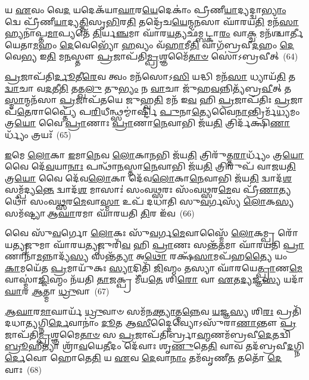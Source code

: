 𑌯 \ul{𑌏}\-𑌵𑌂 𑌵𑍇\-\ul{𑌦} 𑌯𑌦𑍇𑌕᳴𑌯𑌾\-\ul{𑌘𑌾}\-𑌰\-\ul{𑌯𑍇}\-𑌦𑍇𑌕𑌾𑌂॑ 𑌪𑍍𑌰𑍀𑌣𑍀\-\ul{𑌯𑌾}\-𑌦𑍍𑌯𑌦𑍍𑌦𑍍𑌵𑌾\-\ul{𑌭𑍍𑌯𑌾𑌂} 𑌦𑍍𑌵𑍇 𑌪𑍍𑌰𑍀᳴𑌣𑍀\-\ul{𑌯𑌾}\-𑌦𑍍𑌯\-\ul{𑌤𑍍𑌤𑌿}\-𑌸𑍃\-\ul{𑌭𑌿}\-𑌰\-\ul{𑌤𑌿} 𑌤𑌦𑍍𑌰𑍇᳴𑌚\-\ul{𑌯𑍇}\-𑌨𑍍𑌮\-\ul{𑌨}\-𑌸𑌾 𑌘𑌾᳴𑌰𑌯\-\ul{𑌤𑌿} 𑌮𑌨᳴\-\ul{𑌸𑌾} 𑌹𑍍𑌯𑌨𑌾॑𑌪𑍍𑌤\-\ul{𑌮𑌾}\-𑌪𑍍𑌯𑌤𑍇᳴ \ul{𑌤𑌿}\-𑌰𑍍𑌯\-\ul{𑌞𑍍𑌚}\-𑌮𑌾 𑌘𑌾᳴𑌰\-\ul{𑌯}\-𑌤𑍍𑌯𑌛᳴𑌮𑍍𑌬𑌟𑍍𑌕𑌾\-\ul{𑌰𑌂} 𑌵𑌾\-\ul{𑌕𑍍𑌚} 𑌮𑌨᳴𑌶𑍍𑌚𑌾𑌰𑍍𑌤𑍀𑌯𑍇𑌤𑌾\-\ul{𑌮}\-𑌹𑌂 \ul{𑌦𑍇}\-𑌵𑍇𑌭𑍍𑌯𑍋᳴ \ul{𑌹}\-𑌵𑍍𑌯𑌂 𑌵᳴\-\ul{𑌹𑌾}\-𑌮𑍀\-\ul{𑌤𑌿} 𑌵𑌾𑌗᳴𑌬𑍍𑌰𑌵𑍀\-\ul{𑌦}\-𑌹𑌂 \ul{𑌦𑍇}\-𑌵𑍇\-\ul{𑌭𑍍𑌯} 𑌇\-\ul{𑌤𑌿} 𑌮\-\ul{𑌨}\-𑌸𑍍𑌤𑍗 \ul{𑌪𑍍𑌰}\-𑌜𑌾𑌪᳴𑌤𑌿\-\ul{𑌮𑍍𑌪𑍍𑌰}\-𑌶𑍍𑌞𑌮𑍈᳴\-\ul{𑌤𑌾}\-\-\ul{𑍞} 𑌸𑍋॑\-𑌽𑌬𑍍𑌰𑌵𑍀𑌤𑍍~(64)

\-\ul{𑌪𑍍𑌰}\-𑌜𑌾𑌪᳴𑌤𑌿\-\ul{𑌰𑍍𑌦𑍂}\-𑌤𑍀\-\ul{𑌰𑍇}\-𑌵 𑌤𑍍𑌵𑌂 𑌮𑌨᳴𑌸𑍋\-𑌽\-\ul{𑌸𑌿} 𑌯𑌦𑍍𑌧𑌿 𑌮𑌨᳴\-\ul{𑌸𑌾} 𑌧𑍍𑌯𑌾𑌯᳴\-\ul{𑌤𑌿} 𑌤\-\ul{𑌦𑍍𑌵𑌾}\-𑌚𑌾 𑌵\-\ul{𑌦}\-𑌤𑍀\-\ul{𑌤𑌿} 𑌤𑌤𑍍𑌖\-\ul{𑌲𑍁} 𑌤𑍁\-\ul{𑌭𑍍𑌯𑌂} 𑌨 \ul{𑌵𑌾}\-𑌚𑌾 𑌜𑍁᳴𑌹\-\ul{𑌵}\-𑌨𑍍𑌨𑌿𑌤𑍍𑌯᳴𑌬𑍍𑌰\-\ul{𑌵𑍀}\-𑌤𑍍 𑌤\-\ul{𑌸𑍍𑌮𑌾}\-𑌨𑍍𑌮𑌨᳴𑌸𑌾 \ul{𑌪𑍍𑌰}\-𑌜𑌾𑌪᳴𑌤𑌯𑍇 𑌜𑍁𑌹𑍍𑌵\-\ul{𑌤𑌿} 𑌮𑌨᳴ 𑌇\-\ul{𑌵} 𑌹𑌿 \ul{𑌪𑍍𑌰}\-𑌜𑌾𑌪᳴𑌤𑌿𑌃 \ul{𑌪𑍍𑌰}\-𑌜𑌾𑌪᳴\-\ul{𑌤𑍇}\-𑌰𑌾𑌪𑍍𑌤𑍍𑌯𑍈᳴ 𑌪\-\ul{𑌰𑌿}\-𑌧𑍀𑌨𑍍𑌥𑍍𑌸𑌮𑍍𑌮𑌾॑𑌰𑍍𑌷𑍍𑌟𑌿 \ul{𑌪𑍁}\-𑌨𑌾\-\ul{𑌤𑍍𑌯𑍇}\-𑌵𑍈\-\ul{𑌨𑌾}\-𑌨𑍍𑌤𑍍𑌰𑌿𑌰𑍍𑌮᳴\-\ul{𑌧𑍍𑌯}\-𑌮𑌂 𑌤𑍍𑌰\-\ul{𑌯𑍋} 𑌵𑍈 \ul{𑌪𑍍𑌰𑌾}\-𑌣𑌾𑌃 \ul{𑌪𑍍𑌰𑌾}\-𑌣𑌾\-\ul{𑌨𑍇}\-𑌵𑌾𑌭𑌿 𑌜᳴𑌯\-\ul{𑌤𑌿} 𑌤𑍍𑌰𑌿𑌰𑍍𑌦᳴𑌕𑍍𑌷𑌿\-\ul{𑌣𑌾}\-𑌰𑍍𑌧𑍍𑌯𑌂᳴ 𑌤𑍍𑌰𑌯𑌃᳴~(65)

\-\ul{𑌇}\-𑌮𑍇 \ul{𑌲𑍋}\-𑌕𑌾 \ul{𑌇}\-𑌮𑌾\-\ul{𑌨𑍇}\-𑌵 \ul{𑌲𑍋}\-𑌕𑌾\-\ul{𑌨}\-𑌭𑌿 𑌜᳴𑌯\-\ul{𑌤𑌿} 𑌤𑍍𑌰𑌿𑌰𑍁᳴𑌤𑍍𑌤\-\ul{𑌰𑌾}\-𑌰𑍍𑌧𑍍𑌯𑌂᳴ 𑌤𑍍𑌰\-\ul{𑌯𑍋} 𑌵𑍈 𑌦𑍇᳴\-\ul{𑌵}\-𑌯𑌾\-\ul{𑌨𑌾𑌃} 𑌪𑌨𑍍𑌥𑌾᳴\-\ul{𑌨}\-𑌸𑍍𑌤𑌾\-\ul{𑌨𑍇}\-𑌵𑌾𑌭𑌿 𑌜᳴𑌯\-\ul{𑌤𑌿} 𑌤𑍍𑌰𑌿𑌰𑍁𑌪᳴ 𑌵𑌾𑌜𑌯\-\ul{𑌤𑌿} 𑌤𑍍𑌰\-\ul{𑌯𑍋} 𑌵𑍈 𑌦𑍇᳴𑌵\-\ul{𑌲𑍋}\-𑌕𑌾 𑌦𑍇᳴𑌵\-\ul{𑌲𑍋}\-𑌕𑌾\-\ul{𑌨𑍇}\-𑌵𑌾𑌭𑌿 𑌜᳴𑌯\-\ul{𑌤𑌿} 𑌦𑍍𑌵𑌾𑌦᳴\-\ul{𑌶} 𑌸𑌮𑍍𑌪᳴𑌦𑍍𑌯\-\ul{𑌨𑍍𑌤𑍇} 𑌦𑍍𑌵𑌾𑌦᳴\-\ul{𑌶} 𑌮𑌾𑌸𑌾𑌃॑ 𑌸𑌂𑌵\-\ul{𑌥𑍍𑌸}\-𑌰𑌃 𑌸𑌂᳴𑌵\-\ul{𑌥𑍍𑌸}\-𑌰\-\ul{𑌮𑍇}\-𑌵 𑌪𑍍𑌰𑍀᳴\-\ul{𑌣𑌾}\-𑌤𑍍𑌯𑌥𑍋᳴ 𑌸𑌂𑌵\-\ul{𑌥𑍍𑌸}\-𑌰\-\ul{𑌮𑍇}\-𑌵𑌾\-\ul{𑌸𑍍𑌮𑌾} 𑌉𑌪᳴ 𑌦𑌧𑌾𑌤𑌿 𑌸𑍁\-\ul{𑌵}\-𑌰𑍍𑌗𑌸𑍍𑌯᳴ \ul{𑌲𑍋}\-𑌕\-\ul{𑌸𑍍𑌯} 𑌸𑌮᳴𑌷𑍍𑌟𑍍𑌯𑌾 𑌆\-\ul{𑌘𑌾}\-𑌰𑌮𑌾 𑌘𑌾᳴𑌰𑌯𑌤𑌿 \ul{𑌤𑌿}\-𑌰 𑌇᳴𑌵~(66)

𑌵𑍈 𑌸𑍁᳴\-\ul{𑌵}\-𑌰𑍍𑌗𑍋 \ul{𑌲𑍋}\-𑌕𑌃 𑌸𑍁᳴\-\ul{𑌵}\-𑌰𑍍𑌗\-\ul{𑌮𑍇}\-𑌵𑌾𑌸𑍍𑌮𑍈᳴ \ul{𑌲𑍋}\-𑌕𑌮𑍍𑌪𑍍𑌰 𑌰𑍋᳴𑌯\-\ul{𑌤𑍍𑌯𑍃}\-𑌜𑍁𑌮𑌾 𑌘𑌾᳴𑌰𑌯\-\ul{𑌤𑍍𑌯𑍃}\-𑌜𑍁𑌰𑌿᳴\-\ul{𑌵} 𑌹𑌿 \ul{𑌪𑍍𑌰𑌾}\-𑌣𑌃 𑌸𑌨𑍍𑌤᳴\-\ul{𑌤}\-𑌮𑌾 𑌘𑌾᳴𑌰𑌯𑌤𑌿 \ul{𑌪𑍍𑌰𑌾}\-𑌣𑌾𑌨𑌾᳴\-\ul{𑌮}\-𑌨𑍍𑌨𑌾𑌦𑍍𑌯᳴\-\ul{𑌸𑍍𑌯} 𑌸𑌨𑍍𑌤᳴\-\ul{𑌤𑍍𑌯𑌾} 𑌅\-\ul{𑌥𑍋} 𑌰𑌕𑍍𑌷᳴\-\ul{𑌸𑌾}\-𑌮𑌪᳴𑌹\-\ul{𑌤𑍍𑌯𑍈} 𑌯𑌂 \ul{𑌕𑌾}\-𑌮𑌯𑍇᳴𑌤 \ul{𑌪𑍍𑌰}\-𑌮𑌾𑌯𑍁᳴𑌕𑌃 \ul{𑌸𑍍𑌯𑌾}\-𑌦𑌿𑌤𑌿᳴ \ul{𑌜𑌿}\-𑌹𑍍𑌮𑌂 𑌤𑌸𑍍𑌯𑌾 𑌘𑌾᳴𑌰𑌯𑍇\-\ul{𑌤𑍍𑌪𑍍𑌰𑌾}\-𑌣\-\ul{𑌮𑍇}\-𑌵𑌾𑌸𑍍𑌮𑌾॑\-\ul{𑌜𑍍𑌜𑌿}\-𑌹𑍍𑌮𑌂 𑌨᳴𑌯𑌤𑌿 \ul{𑌤𑌾}\-𑌜𑌕𑍍𑌪𑍍𑌰 𑌮𑍀᳴𑌯\-\ul{𑌤𑍇} 𑌶𑌿\-\ul{𑌰𑍋} 𑌵𑌾 \ul{𑌏}\-𑌤\-\ul{𑌦𑍍𑌯}\-𑌜𑍍𑌞\-\ul{𑌸𑍍𑌯} 𑌯𑌦𑌾᳴\-\ul{𑌘𑌾}\-𑌰 \ul{𑌆}\-𑌤𑍍𑌮𑌾 \ul{𑌧𑍍𑌰𑍁}\-𑌵𑌾~(67)

\-\ul{𑌆}\-\-\ul{𑌘𑌾}\-𑌰\-\ul{𑌮𑌾}\-𑌘𑌾𑌰𑍍𑌯᳴ \ul{𑌧𑍍𑌰𑍁}\-𑌵𑌾𑍞 𑌸𑌮᳴𑌨\-\ul{𑌕𑍍𑌤𑍍𑌯𑌾}\-𑌤𑍍𑌮\-\ul{𑌨𑍍𑌨𑍇}\-𑌵 \ul{𑌯}\-𑌜𑍍𑌞\-\ul{𑌸𑍍𑌯} 𑌶𑌿\-\ul{𑌰𑌃} 𑌪𑍍𑌰𑌤𑌿᳴ 𑌦𑌧𑌾𑌤𑍍𑌯𑌗𑍍𑌨𑌿\-\ul{𑌰𑍍𑌦𑍇}\-𑌵𑌾𑌨𑌾𑌂॑ \ul{𑌦𑍂}\-𑌤 𑌆\-\ul{𑌸𑍀}\-𑌦𑍍𑌦𑍈𑌵𑍍𑌯𑍋\-𑌽𑌸𑍁᳴𑌰𑌾\-\ul{𑌣𑌾}\-𑌨𑍍𑌤𑍗 \ul{𑌪𑍍𑌰}\-𑌜𑌾𑌪᳴𑌤𑌿\-\ul{𑌮𑍍𑌪𑍍𑌰}\-𑌶𑍍𑌞𑌮𑍈\-\ul{𑌤𑌾}\-\-\ul{𑍞} 𑌸 \ul{𑌪𑍍𑌰}\-𑌜𑌾𑌪᳴𑌤𑌿𑌰𑍍𑌬𑍍𑌰𑌾\-\ul{𑌹𑍍𑌮}\-𑌣𑌮᳴𑌬𑍍𑌰𑌵𑍀\-\ul{𑌦𑍇}\-𑌤𑌦𑍍𑌵𑌿 \ul{𑌬𑍍𑌰𑍂}\-𑌹𑍀𑌤𑍍𑌯𑌾 𑌶𑍍𑌰𑌾᳴\-\ul{𑌵}\-𑌯𑍇\-\ul{𑌤𑍀}\-𑌦𑌂 𑌦𑍇᳴𑌵𑌾𑌃 𑌶𑍃\-\ul{𑌣𑍁}\-𑌤𑍇\-\ul{𑌤𑌿} 𑌵𑌾𑌵 𑌤𑌦᳴𑌬𑍍𑌰𑌵𑍀\-\ul{𑌦}\-𑌗𑍍𑌨𑌿\-\ul{𑌰𑍍𑌦𑍇}\-𑌵𑍋 𑌹𑍋𑌤𑍇\-\ul{𑌤𑌿} 𑌯 \ul{𑌏}\-𑌵 \ul{𑌦𑍇}\-𑌵𑌾\-\ul{𑌨𑌾𑌂} 𑌤𑌮᳴𑌵𑍃𑌣𑍀\-\ul{𑌤} 𑌤𑌤𑍋᳴ \ul{𑌦𑍇}\-𑌵𑌾𑌃~(68)

